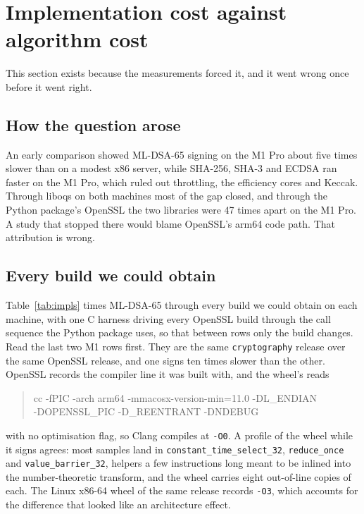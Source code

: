 \section{Implementation cost against algorithm cost}
\label{sec:backends}

This section exists because the measurements forced it, and it went wrong once
before it went right.

\subsection{How the question arose}

An early comparison showed ML-DSA-65 signing on the M1 Pro about five times
slower than on a modest x86 server, while SHA-256, SHA-3 and ECDSA ran faster
on the M1 Pro, which ruled out throttling, the efficiency cores and Keccak.
Through liboqs on both machines most of the gap closed, and through the
Python package's OpenSSL the two libraries were 47 times apart on the M1 Pro.
A study that stopped there would blame OpenSSL's arm64 code path. That
attribution is wrong.

\subsection{Every build we could obtain}



Table~\ref{tab:impls} times ML-DSA-65 through every build we could obtain on
each machine, with one C harness driving every OpenSSL build through the call
sequence the Python package uses, so that between rows only the build
changes. Read the last two M1 rows first. They are the same
\texttt{cryptography} release over the same OpenSSL release, and one signs
ten times slower than the other. OpenSSL records the compiler line it was
built with, and the wheel's reads
\begin{quote}\small\ttfamily
cc -fPIC -arch arm64 -mmacosx-version-min=11.0 -DL\_ENDIAN\\
\quad -DOPENSSL\_PIC -D\_REENTRANT -DNDEBUG
\end{quote}
with no optimisation flag, so Clang compiles at \texttt{-O0}. A profile of the
wheel while it signs agrees: most samples land in
\texttt{constant\_time\_\allowbreak select\_32},
\texttt{reduce\_\allowbreak once} and \texttt{value\_\allowbreak barrier\_32},
helpers a few instructions long meant to be inlined into the number-theoretic
transform, and the wheel carries eight out-of-line copies of each. The Linux
x86-64 wheel of the same release records \texttt{-O3}, which accounts for the
difference that looked like an architecture effect.

